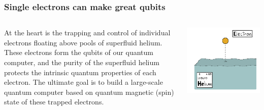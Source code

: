 \documentclass{beamer}
\begin{document}
\frame
    {
      \frametitle{Single electrons can make great qubits}
	
      \begin{footnotesize}
     \begin{columns}
       \column{5.0cm}

       At the heart is the trapping and control
       of individual electrons floating above pools of superfluid
       helium. These electrons form the qubits of our quantum
       computer, and the purity of the superfluid helium protects the
       intrinsic quantum properties of each electron. The  ultimate
       goal is to build a large-scale quantum computer based on
       quantum magnetic (spin) state of these trapped electrons.
\column{5cm}
      \begin{center}
	\includegraphics[width=1.2\textwidth]{qcfigures/nordicquantumfig1.png}
      \end{center}
\end{columns}
      \end{footnotesize}
    }
\end{document}
